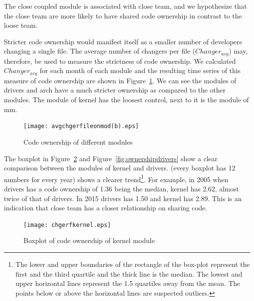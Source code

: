 \documentclass{sig-alternate-05-2015}
\begin{document}
The close coupled module is associated with close team, and we hypothesize 
that the close team are more likely to have shared code ownership in contrast
to the loose team.

Stricter code ownership would manifest itself as a smaller number of
developers changing a single file. The average number of changers
per file ($Changer_{avg}$) may, therefore, be used to measure the
strictness of code ownership. We calculated $Changer_{avg}$ for each
month of each module and the resulting time series of this measure of code
ownership are shown in Figure~\ref{fig:ownership}. 
We can see the modules of drivers and arch have a much stricter
ownership as compared to the other modules.
The module of kernel has the loosest control, next to it is the module of mm. 

\begin{figure}
\centering
\texttt{[image: avgchgerfileonmod(b).eps]}
\caption{Code ownership of different modules}
\label{fig:ownership}
\end{figure}

The boxplot in Figure~\ref{fig:ownershipkernel} and Figure~\ref{fig:ownershipdrivers}
show a clear comparison between the modules of kernel and drivers.
(every boxplot has 12 numbers for every year) shows a clearer trend\footnote {The lower and
  upper boundaries of the rectangle of the box-plot represent the
  first and the third quartile and the thick line is the median. The
  lowest and upper horizontal lines represent the 1.5 quartiles away
  from the mean. The points below or above the horizontal lines are
  suspected outliers.}.
For example, in 2005 when drivers has a code ownership of 1.36 being the median, 
kernel has 2.62, almost twice of that of drivers.
In 2015 drivers has 1.50 and kernel has 2.89.
This is an indication that close team has a closer relationship on
sharing code.

\begin{figure}
\centering
\texttt{[image: chgerfkernel.eps]} %
\caption{Boxplot of code ownership of kernel module}
\label{fig:ownershipkernel}
\end{figure}
\end{document}
